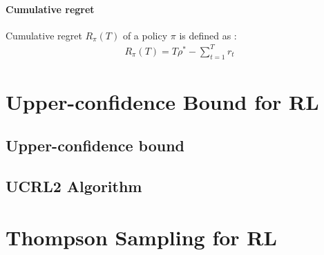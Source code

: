 \documentclass[a4paper,10pt]{article}
\begin{document}
\paragraph{Cumulative regret\\}
Cumulative regret $R_{\pi}(T)$ of a policy $\pi$ is defined as : 
\begin{align*}
R_{\pi}(T) = T\rho^{*} - \sum\limits_{t = 1}^{T} r_t
\end{align*}

\section{Upper-confidence Bound for RL}
\subsection{Upper-confidence bound}
\subsection{UCRL2 Algorithm}

\section{Thompson Sampling for RL}



\end{document}
